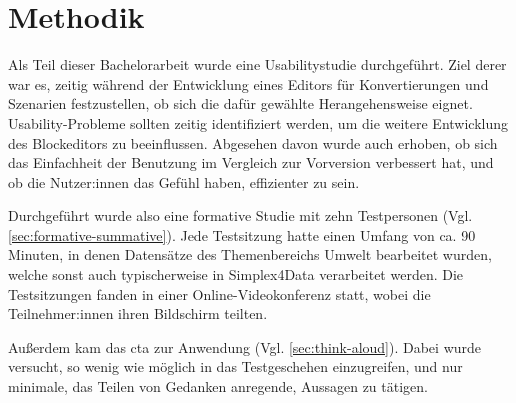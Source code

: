 \section{Methodik}

Als Teil dieser Bachelorarbeit wurde eine Usabilitystudie durchgeführt. Ziel derer war es, zeitig während der Entwicklung eines Editors für Konvertierungen und Szenarien festzustellen, ob sich die dafür gewählte Herangehensweise eignet. Usability-Probleme sollten zeitig identifiziert werden, um die weitere Entwicklung des Blockeditors zu beeinflussen. Abgesehen davon wurde auch erhoben, ob sich das Einfachheit der Benutzung im Vergleich zur Vorversion verbessert hat, und ob die Nutzer:innen das Gefühl haben, effizienter zu sein.

Durchgeführt wurde also eine formative Studie mit zehn Testpersonen (Vgl. \ref{sec:formative-summative}). Jede Testsitzung hatte einen Umfang von ca. 90 Minuten, in denen Datensätze des Themenbereichs Umwelt bearbeitet wurden, welche sonst auch typischerweise in Simplex4Data verarbeitet werden. Die Testsitzungen fanden in einer Online-Videokonferenz statt, wobei die Teilnehmer:innen ihren Bildschirm teilten.

Außerdem kam das \acf{cta} zur Anwendung (Vgl. \ref{sec:think-aloud}). Dabei wurde versucht, so wenig wie möglich in das Testgeschehen einzugreifen, und nur minimale, das Teilen von Gedanken anregende, Aussagen zu tätigen.
